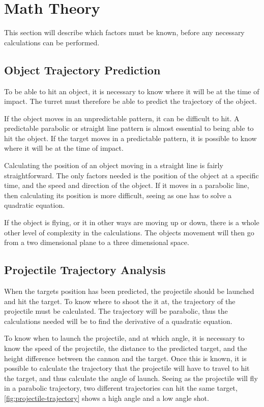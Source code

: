 \section{Math Theory}
\label{maththeory}
This section will describe which factors must be known, before any necessary calculations can be performed.

\subsection{Object Trajectory Prediction}
To be able to hit an object, it is necessary to know where it will be at the time of impact. The turret must therefore be able to predict the trajectory of the object.

If the object moves in an unpredictable pattern, it can be difficult to hit. A predictable parabolic or straight line pattern is almost essential to being able to hit the object. If the target moves in a predictable pattern, it is possible to know where it will be at the time of impact.

Calculating the position of an object moving in a straight line is fairly straightforward. The only factors needed is the position of the object at a specific time, and the speed and direction of the object. If it moves in a parabolic line, then calculating its position is more difficult, seeing as one has to solve a quadratic equation.

If the object is flying, or it in other ways are moving up or down, there is a whole other level of complexity in the calculations. The objects movement will then go from a two dimensional plane to a three dimensional space.

\subsection{Projectile Trajectory Analysis}
When the targets position has been predicted, the projectile should be launched and hit the target. To know where to shoot the it at, the trajectory of the projectile must be calculated.
The trajectory will be parabolic\cite{trajectoryanalysis}, thus the calculations needed will be to find the derivative of a quadratic equation.

To know when to launch the projectile, and at which angle, it is necessary to know the speed of the projectile, the distance to the predicted target, and the height difference between the cannon and the target. Once this is known, it is possible to calculate the trajectory that the projectile will have to travel to hit the target, and thus calculate the angle of launch. Seeing as the projectile will fly in a parabolic trajectory, two different trajectories can hit the same target, \autoref{fig:projectile-trajectory} shows a high angle and a low angle shot.

